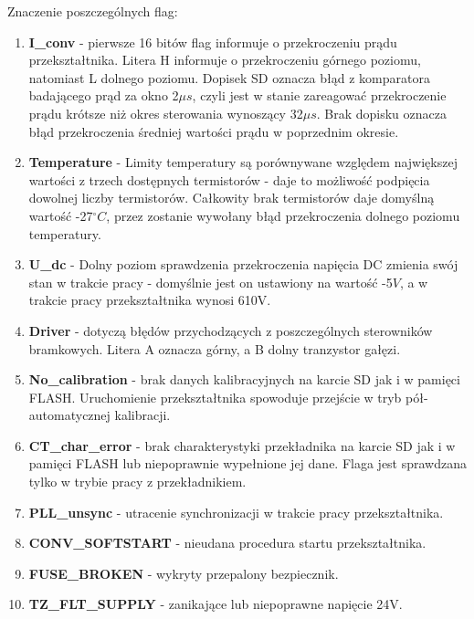 \documentclass[12pt,a4paper]{article}
\begin{document}
Znaczenie poszczególnych flag:
\begin{enumerate}
	\setlength\itemsep{0mm}
	\item \textbf{I\_conv} - pierwsze 16 bitów flag informuje o przekroczeniu prądu przekształtnika. Litera H informuje o przekroczeniu górnego poziomu, natomiast L dolnego poziomu. Dopisek SD oznacza błąd z komparatora badającego prąd za okno 2$\mu s$, czyli jest w stanie zareagować przekroczenie prądu krótsze niż okres sterowania wynoszący 32$\mu s$. Brak dopisku oznacza błąd przekroczenia średniej wartości prądu w poprzednim okresie.
	
	\item \textbf{Temperature} - Limity temperatury są porównywane względem największej wartości z trzech dostępnych termistorów - daje to możliwość podpięcia dowolnej liczby termistorów. Całkowity brak termistorów daje domyślną wartość -27$^\circ C$, przez zostanie wywołany błąd przekroczenia dolnego poziomu temperatury.
	
	\item \textbf{U\_dc} - Dolny poziom sprawdzenia przekroczenia napięcia DC zmienia swój stan w trakcie pracy - domyślnie jest on ustawiony na wartość -5$V$, a w trakcie pracy przekształtnika wynosi 610V.
	
	\item \textbf{Driver} - dotyczą błędów przychodzących z poszczególnych sterowników bramkowych. Litera A oznacza górny, a B dolny tranzystor gałęzi.

	\item \textbf{No\_calibration} - brak danych kalibracyjnych na karcie SD jak i w pamięci FLASH. Uruchomienie przekształtnika spowoduje przejście w tryb pół-automatycznej kalibracji.

	\item \textbf{CT\_char\_error} - brak charakterystyki przekładnika na karcie SD jak i w pamięci FLASH lub niepoprawnie wypełnione jej dane. Flaga jest sprawdzana tylko w trybie pracy z przekładnikiem.

	\item \textbf{PLL\_unsync} - utracenie synchronizacji w trakcie pracy przekształtnika.

	\item \textbf{CONV\_SOFTSTART} - nieudana procedura startu przekształtnika.

	\item \textbf{FUSE\_BROKEN} - wykryty przepalony bezpiecznik.
	
	\item \textbf{TZ\_FLT\_SUPPLY} - zanikające lub niepoprawne napięcie 24V.
	

\end{enumerate}
\end{document}
